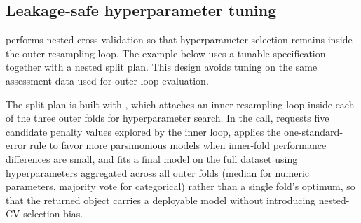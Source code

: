 \documentclass[article,shortnames]{jss}
\begin{document}
\subsection{Leakage-safe hyperparameter tuning}

 performs nested cross-validation so that hyperparameter selection remains inside the outer resampling loop. The example below uses a tunable  specification together with a nested split plan. This design avoids tuning on the same assessment data used for outer-loop evaluation.

The split plan is built with , which attaches an inner resampling loop inside each of the three outer folds for hyperparameter search. In the  call,  requests five candidate penalty values explored by the inner loop,  applies the one-standard-error rule to favor more parsimonious models when inner-fold performance differences are small, and  fits a final model on the full dataset using hyperparameters aggregated across all outer folds (median for numeric parameters, majority vote for categorical) rather than a single fold's optimum, so that the returned object carries a deployable model without introducing nested-CV selection bias.
\end{document}
